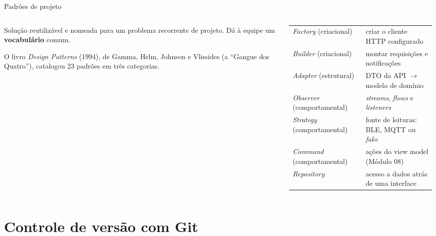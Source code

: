 \documentclass[aspectratio=169,10pt]{beamer}
\begin{document}
\begin{frame}{Padrões de projeto}
  \begin{columns}[T]
    \begin{column}{0.5\textwidth}
      \begin{definicao}
        Solução reutilizável e nomeada para um problema recorrente de projeto. Dá à equipe um \textbf{vocabulário} comum.
      \end{definicao}
      \begin{historia}
        O livro \emph{Design Patterns} (1994), de Gamma, Helm, Johnson e Vlissides (a ``Gangue dos Quatro''), catalogou 23 padrões em três categorias.
      \end{historia}
    \end{column}
    \begin{column}{0.48\textwidth}
      \scriptsize
      \begin{tabularx}{\linewidth}{@{}l L@{}}
        \toprule
         &  \\
        \midrule
        \emph{Factory} (criacional) & criar o cliente HTTP configurado \\
        \emph{Builder} (criacional) & montar requisições e notificações \\
        \emph{Adapter} (estrutural) & DTO da API $\rightarrow$ modelo de domínio \\
        \emph{Observer} (comportamental) & \emph{streams}, \emph{flows} e \emph{listeners} \\
        \emph{Strategy} (comportamental) & fonte de leituras: BLE, MQTT ou \emph{fake} \\
        \emph{Command} (comportamental) & ações do view model (Módulo 08) \\
        \emph{Repository} & acesso a dados atrás de uma interface \\
        \bottomrule
      \end{tabularx}
    \end{column}
  \end{columns}
\end{frame}

\section{Controle de versão com Git}
\end{document}
